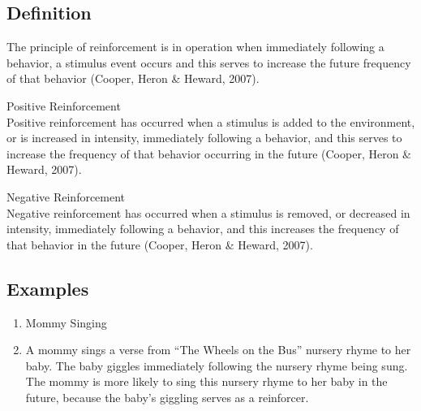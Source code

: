 \subsection{Definition}
The principle of reinforcement is in operation when immediately following a behavior, a stimulus event occurs and this serves to increase the future frequency of that behavior (Cooper, Heron \& Heward, 2007).

Positive Reinforcement\\
Positive reinforcement has occurred when a stimulus is added to the environment, or is increased in intensity, immediately following a behavior, and this serves to increase the frequency of that behavior occurring in the future (Cooper, Heron \& Heward, 2007).

Negative Reinforcement\\
Negative reinforcement has occurred when a stimulus is removed, or decreased in intensity, immediately following a behavior, and this increases the frequency of that behavior in the future (Cooper, Heron \& Heward, 2007).
\subsection{Examples}
\begin{enumerate}
\item Mommy Singing
\item A mommy sings a verse from ``The Wheels on the Bus'' nursery rhyme to her baby. The baby giggles immediately following the nursery rhyme being sung. The mommy is more likely to sing this nursery rhyme to her baby in the future, because the baby's giggling serves as a reinforcer.
\end{enumerate}
 
